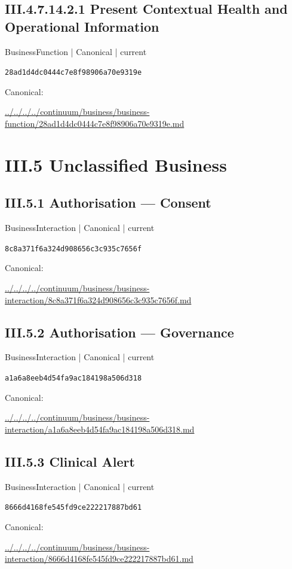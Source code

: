 \documentclass[10pt,a4paper]{article}
\begin{document}
\subsection*{III.4.7.14.2.1 Present Contextual Health and Operational Information}
\label{element-28ad1d4dc0444c7e8f98906a70e9319e}
{\small BusinessFunction | Canonical | current}\par
\texttt{28ad1d4dc0444c7e8f98906a70e9319e}\par
Canonical: \par
{\footnotesize\url{../../../../continuum/business/business-function/28ad1d4dc0444c7e8f98906a70e9319e.md}}\par
\section*{III.5 Unclassified Business}
\subsection*{III.5.1 Authorisation — Consent}
\label{element-8c8a371f6a324d908656c3c935c7656f}
{\small BusinessInteraction | Canonical | current}\par
\texttt{8c8a371f6a324d908656c3c935c7656f}\par
Canonical: \par
{\footnotesize\url{../../../../continuum/business/business-interaction/8c8a371f6a324d908656c3c935c7656f.md}}\par
\subsection*{III.5.2 Authorisation — Governance}
\label{element-a1a6a8eeb4d54fa9ac184198a506d318}
{\small BusinessInteraction | Canonical | current}\par
\texttt{a1a6a8eeb4d54fa9ac184198a506d318}\par
Canonical: \par
{\footnotesize\url{../../../../continuum/business/business-interaction/a1a6a8eeb4d54fa9ac184198a506d318.md}}\par
\subsection*{III.5.3 Clinical Alert}
\label{element-8666d4168fe545fd9ce222217887bd61}
{\small BusinessInteraction | Canonical | current}\par
\texttt{8666d4168fe545fd9ce222217887bd61}\par
Canonical: \par
{\footnotesize\url{../../../../continuum/business/business-interaction/8666d4168fe545fd9ce222217887bd61.md}}\par
\end{document}
